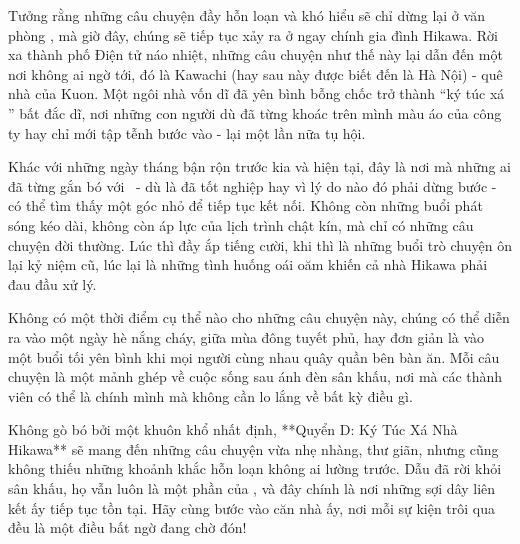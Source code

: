 \documentclass[main.tex]{subfiles}
\begin{document}
Tưởng rằng những câu chuyện đầy hỗn loạn và khó hiểu sẽ chỉ dừng lại ở văn phòng \hll, mà giờ đây, chúng sẽ tiếp tục xảy ra ở ngay chính gia đình Hikawa. Rời xa thành phố Điện tử náo nhiệt, những câu chuyện như thế này lại dẫn đến một nơi không ai ngờ tới, đó là Kawachi (hay sau này được biết đến là Hà Nội) - quê nhà của Kuon. Một ngôi nhà vốn dĩ đã yên bình bỗng chốc trở thành ``ký túc xá \hll'' bất đắc dĩ, nơi những con người dù đã từng khoác trên mình màu áo của công ty hay chỉ mới tập tễnh bước vào - lại một lần nữa tụ hội.

Khác với những ngày tháng bận rộn trước kia và hiện tại, đây là nơi mà những ai đã từng gắn bó với \hll\ - dù là đã tốt nghiệp hay vì lý do nào đó phải dừng bước - có thể tìm thấy một góc nhỏ để tiếp tục kết nối. Không còn những buổi phát sóng kéo dài, không còn áp lực của lịch trình chật kín, mà chỉ có những câu chuyện đời thường. Lúc thì đầy ắp tiếng cười, khi thì là những buổi trò chuyện ôn lại kỷ niệm cũ, lúc lại là những tình huống oái oăm khiến cả nhà Hikawa phải đau đầu xử lý.

Không có một thời điểm cụ thể nào cho những câu chuyện này, chúng có thể diễn ra vào một ngày hè nắng cháy, giữa mùa đông tuyết phủ, hay đơn giản là vào một buổi tối yên bình khi mọi người cùng nhau quây quần bên bàn ăn. Mỗi câu chuyện là một mảnh ghép về cuộc sống sau ánh đèn sân khấu, nơi mà các thành viên có thể là chính mình mà không cần lo lắng về bất kỳ điều gì.

Không gò bó bởi một khuôn khổ nhất định, **Quyển D: Ký Túc Xá Nhà Hikawa** sẽ mang đến những câu chuyện vừa nhẹ nhàng, thư giãn, nhưng cũng không thiếu những khoảnh khắc hỗn loạn không ai lường trước. Dẫu đã rời khỏi sân khấu, họ vẫn luôn là một phần của \hll, và đây chính là nơi những sợi dây liên kết ấy tiếp tục tồn tại. Hãy cùng bước vào căn nhà ấy, nơi mỗi sự kiện trôi qua đều là một điều bất ngờ đang chờ đón!

\end{document}
